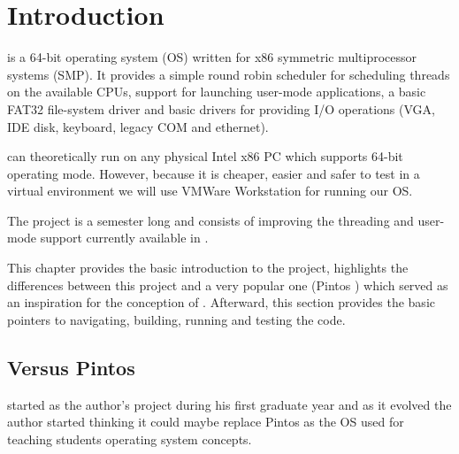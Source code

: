 \chapter{Introduction}
\label{chap:Introduction}

\projectname is a 64-bit operating system (OS) written for x86 symmetric multiprocessor systems
(SMP). It provides a simple round robin scheduler for scheduling threads on the available CPUs,
support for launching user-mode applications, a basic FAT32 file-system driver and basic drivers for
providing I/O operations (VGA, IDE disk, keyboard, legacy COM and ethernet).

\projectname can theoretically run on any physical Intel x86 PC which supports 64-bit operating 
mode. However, because it is cheaper, easier and safer to test in a virtual environment we will use
VMWare Workstation \cite{vmware} for running our OS.

The project is a semester long and consists of improving the threading and user-mode support
currently available in \projectname.

This chapter provides the basic introduction to the project, highlights the differences between this
project and a very popular one (Pintos \cite{pintos}) which served as an inspiration for the 
conception of \projectname. Afterward, this section provides the basic pointers to navigating,
building, running and testing the code.

\section{Versus Pintos}

\projectname started as the author's project during his first graduate year and as it evolved the
author started thinking it could maybe replace Pintos  as the OS used for teaching
students operating system concepts.

